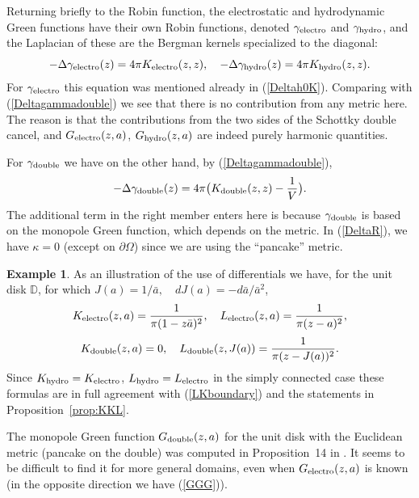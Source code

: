 \documentclass[reqno,12pt]{article}
\theoremstyle{plain}
\theoremstyle{definition}
\newtheorem{example}[defn]{Example}
\numberwithin{equation}{section}
\numberwithin{figure}{section}
\def\D{{\mathbb D}}
\begin{document}
Returning briefly to the Robin function, 
the electrostatic and hydrodynamic Green functions have their own Robin functions, denoted
$\gamma_{\rm electro}$ and $\gamma_{\rm hydro}$, and the Laplacian of these are the Bergman kernels
specialized to the diagonal:
\begin{equation}\label{Deltagamma}
-\Delta \gamma_{\rm electro}(z)=4\pi K_{\rm electro}(z,z), \quad -\Delta \gamma_{\rm hydro}(z)=4\pi K_{\rm hydro}(z,z).
 \end{equation}
For $\gamma_{\rm electro}$ this equation was mentioned already in (\ref{Deltah0K}).
Comparing with (\ref{Deltagammadouble}) we see that there is no contribution from any metric 
here. The reason is that the contributions from the two sides of the Schottky double
cancel, and $G_{\rm electro}(z,a)$, $G_{\rm hydro}(z,a)$ are indeed purely harmonic quantities.
 
For $\gamma_{\rm double}$ we have on the other hand, by (\ref{Deltagammadouble}),
$$
-\Delta\gamma_{\rm double}(z)=4\pi \big(K_{\rm double}(z,z)-\frac{1}{V}\big).
$$
The additional term in the right member enters here is because $\gamma_{\rm double}$ is 
based on the monopole Green function, which depends on the metric. In (\ref{DeltaR}), we have $\kappa =0$
(except on $\partial\Omega$) since we are using the ``pancake'' metric. 

\begin{example}\label{ex:kernels}
As an illustration of the use of differentials we have, for the unit disk $\D$, for which
$J(a)={1}/{\bar{a}}, \quad dJ(a)=-{d\bar{a}}/{\bar{a}^2}$,
$$
K_{\rm electro}(z,a)=\frac{1}{\pi(1-z\bar{a})^2}, \quad L_{\rm electro}(z,a)=\frac{1}{\pi(z-a)^2},
$$
$$
 K_{\rm double}(z,a)=0, \quad L_{\rm double}(z,J(a))=\frac{1}{\pi(z-J(a))^2}.
$$
Since $K_{\rm hydro}=K_{\rm electro}$, $L_{\rm hydro}=L_{\rm electro}$ in the simply connected case
these formulas are in full agreement with (\ref{LKboundary}) and the statements in Proposition~\ref{prop:KKL}.

The monopole Green function $G_{\rm double}(z,a)$ for the unit disk with the Euclidean metric (pancake on the double)
was computed in Proposition~14 in \cite{Grotta-Ragazzo-Gustafsson-Koiller-2024}. It seems to be difficult to find it for
more general domains, even when $G_{\rm electro}(z,a)$ is known (in the opposite direction we have (\ref{GGG})).
\end{example}


\end{document}
